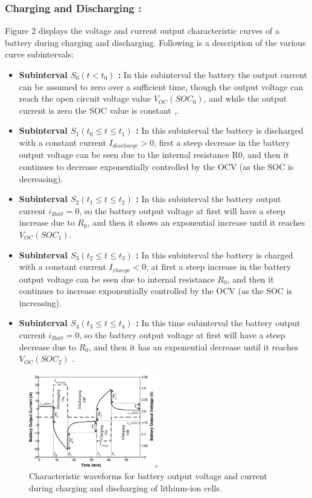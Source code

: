 \subsubsection{Charging and Discharging :}
Figure 2 displays the voltage and current output characteristic curves of a battery during charging and discharging. 
Following is a description of the various curve subintervals:

\begin{itemize}
	\item \textbf{Subinterval $S_0 (t < t_0 )$ :} In this subinterval the battery 
	the output current can be assumed to zero over a sufficient 
	time, though the output voltage can reach the open circuit 
	voltage value $V_{OC}(SOC_0)$, and while the output current is 
	zero the SOC value is constant \cite{UKEMPT_AHMAD2012},\cite{UniPadua_Giacomo}.
	\item \textbf{Subinterval $S_1 (t_0 \leq t \leq  t_1 )$ :}  In this subinterval the battery 
	is discharged with a constant current $I_{discharge} > 0$, first a 
	steep decrease in the battery output voltage can be seen 
	due to the internal resistance R0, and then it continues to 
	decrease exponentially controlled by the OCV (as the SOC 
	is decreasing)\cite{UKEMPT_AHMAD2012}. 
	\item \textbf{Subinterval $S_2 (t_1 \leq t \leq  t_2 )$ :} In this subinterval the battery 
	output current $i_{Batt} = 0$, so the battery output voltage at first 
	will have a steep increase due to $R_0$, and then it shows an 
	exponential increase until it reaches $V_{OC}(SOC_1)$. 
	\item \textbf{Subinterval $S_3 (t_2 \leq t \leq  t_3 )$ :} In this subinterval the battery 
	is charged with a constant current $I_{charge} < 0$; at first a steep 
	increase in the battery output voltage can be seen due to 
	internal resistance $R_0$, and then it continues to increase 
	exponentially controlled by the OCV (as the SOC is 
	increasing)\cite{UKEMPT_AHMAD2012}.
	\item \textbf{Subinterval $S_4 (t_3 \leq t \leq  t_4 )$ :} In this time subinterval the battery 
	output current $i_{Batt} = 0$, so the battery output voltage at first 
	will have a steep decrease due to $R_0$, and then it has an 
	exponential decrease until it reaches $V_{OC}(SOC_2)$ \cite{UKEMPT_AHMAD2012}. 
\end{itemize}

\begin{figure}[h]
	\centering
	\includegraphics[width=0.5\textwidth]{Chap06/Figures/Batt_Pulsed_current_char.PNG}
	\caption{Characteristic waveforms for battery output voltage and current during charging and discharging of lithium-ion cells.}
	\label{fig:Battery_Current_Pulse}
\end{figure}

